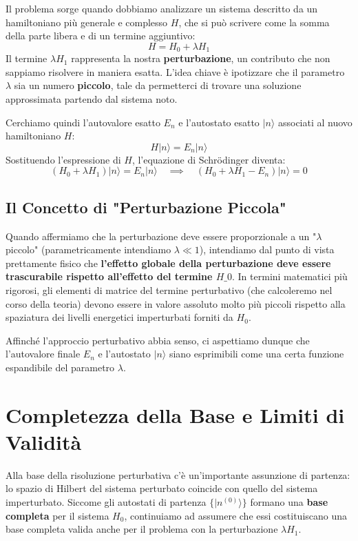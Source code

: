 Il problema sorge quando dobbiamo analizzare un sistema descritto da un hamiltoniano più generale e complesso $H$, che si può scrivere come la somma della parte libera e di un termine aggiuntivo:
\begin{equation}
H = H_0 + \lambda H_1
\end{equation}
Il termine $\lambda H_1$ rappresenta la nostra \textbf{perturbazione}, un contributo che non sappiamo risolvere in maniera esatta. L'idea chiave è ipotizzare che il parametro $\lambda$ sia un numero \textbf{piccolo}, tale da permetterci di trovare una soluzione approssimata partendo dal sistema noto.

Cerchiamo quindi l'autovalore esatto $E_n$ e l'autostato esatto $\vert{}n\rangle$ associati al nuovo hamiltoniano $H$:
\begin{equation}
H |n\rangle = E_n |n\rangle
\end{equation}
Sostituendo l'espressione di $H$, l'equazione di Schrödinger diventa:
\begin{equation}
(H_0 + \lambda H_1) |n\rangle = E_n |n\rangle \quad \implies \quad (H_0 + \lambda H_1 - E_n) |n\rangle = 0
\end{equation}

\subsection{Il Concetto di "Perturbazione Piccola"}
Quando affermiamo che la perturbazione deve essere proporzionale a un "$\lambda$ piccolo" (parametricamente intendiamo $\lambda \ll 1$), intendiamo dal punto di vista prettamente fisico che \textbf{l'effetto globale della perturbazione deve essere trascurabile rispetto all'effetto del termine $H\_0$}. In termini matematici più rigorosi, gli elementi di matrice del termine perturbativo (che calcoleremo nel corso della teoria) devono essere in valore assoluto molto più piccoli rispetto alla spaziatura dei livelli energetici imperturbati forniti da $H_0$.

Affinché l'approccio perturbativo abbia senso, ci aspettiamo dunque che l'autovalore finale $E_n$ e l'autostato $\vert{}n\rangle$ siano esprimibili come una certa funzione espandibile del parametro $\lambda$.

\section{Completezza della Base e Limiti di Validità}

Alla base della risoluzione perturbativa c'è un'importante assunzione di partenza: lo spazio di Hilbert del sistema perturbato coincide con quello del sistema imperturbato. Siccome gli autostati di partenza $\{\vert{}n^{(0)}\rangle\}$ formano una \textbf{base completa} per il sistema $H_0$, continuiamo ad assumere che essi costituiscano una base completa valida anche per il problema con la perturbazione $\lambda H_1$.

